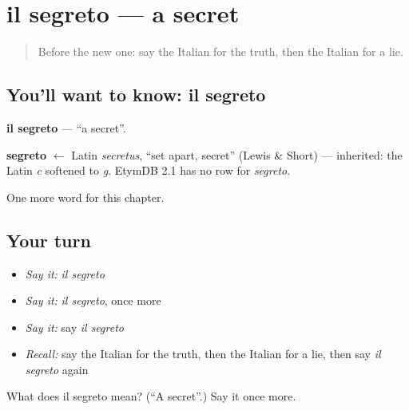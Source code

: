 \section[il segreto]{il segreto — a secret}

\label{lesson:IT-C252-segreto}



\begin{quote}
Before the new one: say the Italian for the truth, then the Italian for a lie.
\end{quote}

\subsection*{You'll want to know: il segreto}
\textbf{il segreto} — \textquotedblleft{}a secret\textquotedblright{}.

\begin{cousinweb}
\textbf{segreto} $\leftarrow$ Latin \emph{secretus}, \textquotedblleft{}set apart, secret\textquotedblright{} (Lewis \& Short) — inherited: the Latin \emph{c} softened to \emph{g}. EtymDB 2.1 has no row for \emph{segreto}.
\end{cousinweb}

\begin{grammarlens}[title={What you've built}]
One more word for this chapter.
\end{grammarlens}

\subsection*{Your turn}
\begin{itemize}
\raggedright
  \item \emph{Say it:} \emph{il segreto}
  \item \emph{Say it:} \emph{il segreto}, once more
  \item \emph{Say it:} say \emph{il segreto}
  \item \emph{Recall:} say the Italian for the truth, then the Italian for a lie, then say \emph{il segreto} again
\end{itemize}

\begin{tcolorbox}[breakable,colback=teal!4,colframe=teal!35!black,title={Before you move on}]
What does il segreto mean? (\textquotedblleft{}A secret\textquotedblright{}.) Say it once more.
\end{tcolorbox}
